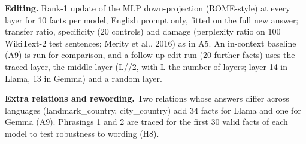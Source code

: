 \documentclass[11pt]{article}
\begin{document}
\textbf{Editing.} Rank-1 update of the MLP down-projection (ROME-style) at every layer for 10 facts per model, English prompt only, fitted on the full new answer; transfer ratio, specificity (20 controls) and damage (perplexity ratio on 100 WikiText-2 test sentences; Merity et al., 2016) as in A5. An in-context baseline (A9) is run for comparison, and a follow-up edit run (20 further facts) uses the traced layer, the middle layer (L//2, with L the number of layers; layer 14 in Llama, 13 in Gemma) and a random layer.

\textbf{Extra relations and rewording.} Two relations whose answers differ across languages (landmark\_country, city\_country) add 34 facts for Llama and one for Gemma (A9). Phrasings 1 and 2 are traced for the first 30 valid facts of each model to test robustness to wording (H8).
\end{document}
